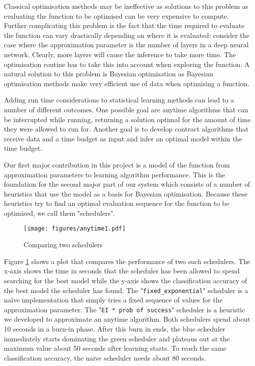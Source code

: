 \documentclass[a4paper,12pt,twoside,openright]{report}
\begin{document}
Classical optimisation methods may be ineffective as solutions to this problem as evaluating the function to be optimised can be very expensive to compute. Further complicating this problem is the fact that the time required to evaluate the function can vary drastically depending on where it is evaluated: consider the case where the approximation parameter is the number of layers in a deep neural network. Clearly, more layers will cause the inference to take more time. The optimisation routine has to take this into account when exploring the function. A natural solution to this problem is Bayesian optimisation as Bayesian optimisation methods make very efficient use of data when optimising a function.

Adding run time considerations to statistical learning methods can lead to a number of different outcomes. One possible goal are anytime algorithms that can be interrupted while running, returning a solution optimal for the amount of time they were allowed to run for. Another goal is to develop contract algorithms that receive data and a time budget as input and infer an optimal model within the time budget.


Our first major contribution in this project is a model of the function from approximation parameters to learning algorithm performance. This is the foundation for the second major part of our system which consists of a number of heuristics that use the model as a basis for Bayesian optimisation. Because these heuristics try to find an optimal evaluation sequence for the function to be optimised, we call them "schedulers".

\begin{figure}
\centering
  \texttt{[image: figures/anytime1.pdf]}
  \caption{Comparing two schedulers}
  \label{anytime1}
\end{figure}

Figure \ref{anytime1} shows a plot that compares the performance of two such schedulers. The x-axis shows the time in seconds that the scheduler has been allowed to spend searching for the best model while the y-axis shows the classification accuracy of the best model the scheduler has found. The "\texttt{fixed\_exponential}" scheduler is a naive implementation that simply tries a fixed sequence of values for the approximation parameter. The "\texttt{EI * prob of success}" scheduler is a heuristic we developed to approximate an anytime algorithm. Both schedulers spend about 10 seconds in a burn-in phase. After this burn in ends, the blue scheduler immediately starts dominating the green scheduler and plateaus out at the maximum value about 50 seconds after learning starts. To reach the same classification accuracy, the naive scheduler needs about 80 seconds.
\end{document}
